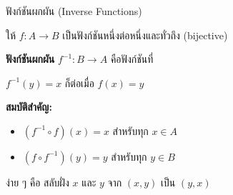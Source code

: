 \documentclass[11pt, aspectratio=169]{beamer}
\begin{document}
\begin{frame}{ฟังก์ชันผกผัน (Inverse Functions)}
  \begin{explanation}[นิยาม]
    ให้ $f: A \to B$ เป็นฟังก์ชันหนึ่งต่อหนึ่งและทั่วถึง (bijective)

    \medskip
    \textbf{ฟังก์ชันผกผัน} $f^{-1}: B \to A$ คือฟังก์ชันที่

    \medskip
    $f^{-1}(y) = x$ ก็ต่อเมื่อ $f(x) = y$

    \medskip
    \textbf{สมบัติสำคัญ:}
    \begin{itemize}
      \item $(f^{-1} \circ f)(x) = x$ สำหรับทุก $x \in A$
      \item $(f \circ f^{-1})(y) = y$ สำหรับทุก $y \in B$
    \end{itemize}
  \end{explanation}

  \begin{intuition}[สังเกต]
    ง่าย ๆ คือ สลับฝั่ง $x$ และ $y$ จาก $(x, y)$ เป็น $(y, x)$
  \end{intuition}
\end{frame}
\end{document}
